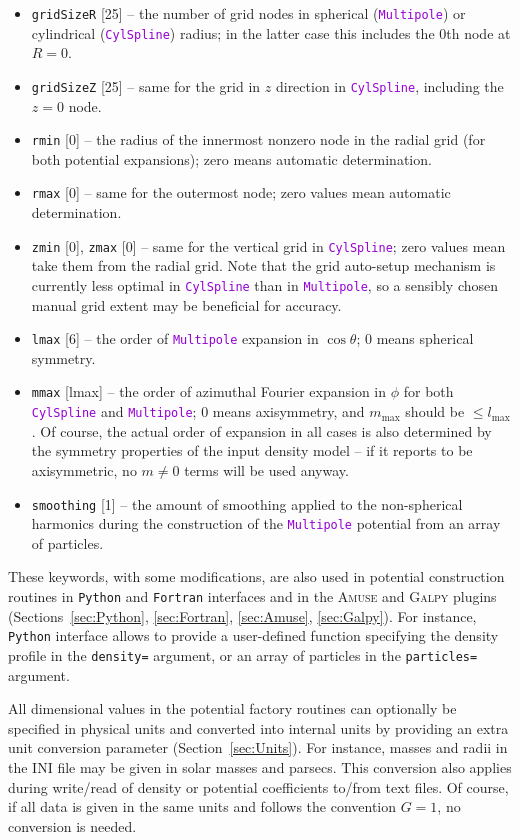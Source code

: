 \documentclass[12pt]{article}
\newcommand{\Amuse}{\textsc{Amuse}\xspace}
\newcommand{\Galpy}{\textsc{Galpy}\xspace}
\newcommand{\Python}{\texttt{Python}\xspace}
\newcommand{\Fortran}{\texttt{Fortran}\xspace}
\newcommand{\ttt}[1]{\textcolor{darkviolet}{\texttt{#1}}}
\newcommand{\ppp}[1]{\textcolor{darkolive} {\texttt{#1}}}
\begin{document}
\begin{itemize}
\item \ppp{gridSizeR} [25] -- the number of grid nodes in spherical (\ttt{Multipole}) or cylindrical (\ttt{CylSpline}) radius; in the latter case this includes the 0th node at $R=0$. 
\item \ppp{gridSizeZ} [25] -- same for the grid in $z$ direction in \ttt{CylSpline}, including the $z=0$ node.
\item \ppp{rmin} [0] -- the radius of the innermost nonzero node in the radial grid (for both potential expansions); zero means automatic determination.
\item \ppp{rmax} [0] -- same for the outermost node; zero values mean automatic determination.
\item \ppp{zmin} [0], \ppp{zmax} [0] -- same for the vertical grid in \ttt{CylSpline}; zero values mean take them from the radial grid. Note that the grid auto-setup mechanism is currently less optimal in \ttt{CylSpline} than in \ttt{Multipole}, so a sensibly chosen manual grid extent may be beneficial for accuracy.
\item \ppp{lmax} [6] -- the order of \ttt{Multipole} expansion in $\cos\theta$; 0 means spherical symmetry. 
\item \ppp{mmax} [lmax] -- the order of azimuthal Fourier expansion in $\phi$ for both  \ttt{CylSpline} and \ttt{Multipole}; 0 means axisymmetry, and $m_\mathrm{max}$ should be $\le l_\mathrm{max}$. Of course, the actual order of expansion in all cases is also determined by the symmetry properties of the input density model -- if it reports to be axisymmetric, no $m\ne 0$ terms will be used anyway.
\item \ppp{smoothing} [1] -- the amount of smoothing applied to the non-spherical harmonics during the construction of the \ttt{Multipole} potential from an array of particles.
\end{itemize}

These keywords, with some modifications, are also used in potential construction routines in \Python and \Fortran interfaces and in the \Amuse and \Galpy plugins (Sections~\ref{sec:Python}, \ref{sec:Fortran}, \ref{sec:Amuse}, \ref{sec:Galpy}). For instance, \Python interface allows to provide a user-defined function specifying the density profile in the \ppp{density=} argument, or an array of particles in the \ppp{particles=} argument.

All dimensional values in the potential factory routines can optionally be specified in physical units and converted into internal units by providing an extra unit conversion parameter (Section~\ref{sec:Units}). For instance, masses and radii in the INI file may be given in solar masses and parsecs. This conversion also applies during write/read of density or potential coefficients to/from text files. Of course, if all data is given in the same units and follows the convention $G=1$, no conversion is needed.
\end{document}
